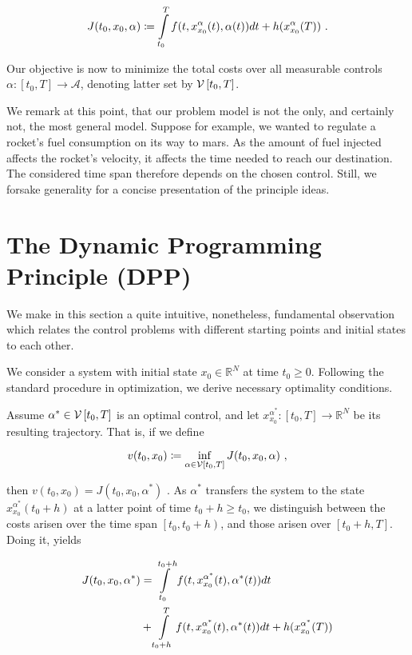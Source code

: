 	\begin{equation*}
	J(t_0, x_0, \alpha) \coloneqq \pathint{\alpha}{t_0}{T} + h(x^{\alpha}_{x_0}(T)) \ .
	\end{equation*}
	
	Our objective is now to minimize the total costs over all measurable controls $ \alpha : \left[t_0, T \right] \to \mathcal{A} $, denoting latter set by $ \controlspace[t_0] $.
	
	We remark at this point, that our problem model is not the only, and certainly not, the most general model. Suppose for example, we wanted to regulate a rocket's fuel consumption on its way to mars. As the amount of fuel injected affects the rocket's velocity, it affects the time needed to reach our destination. The considered time span therefore depends on the chosen control. Still, we forsake generality for a concise presentation of the principle ideas.
	
	\section{The Dynamic Programming Principle (DPP)}
	
	We make in this section a quite intuitive, nonetheless, fundamental observation which relates the control problems with different starting points and initial states to each other.
	
	We consider a system with initial state $ x_0 \in \mathbb{R}^N $ at time $ t_0 \geq 0 $. Following the standard procedure in optimization, we derive necessary optimality conditions. 
	
	Assume $ \alpha^{*} \in \controlspace[t_0] $ is an optimal control, and let $ x^{\alpha^{*}}_{x_0} : \left[t_0, T \right] \to \mathbb{R}^N $ be its resulting trajectory. That is, if we define
	
	\begin{equation*}
		v(t_0, x_0) \coloneqq \inf\limits_{\alpha \in \controlspace[t_0]} J(t_0, x_0, \alpha) \ ,
	\end{equation*}
	
	then $ v(t_0, x_0) = J(t_0, x_0, \alpha^{*}) $ . As  $ \alpha^{*} $ transfers the system to the state $ x^{\alpha^{*}}_{x_0}(t_0 + h) $ at a latter point of time $ t_0 + h \geq t_0 $, we distinguish between the costs arisen over the time span $ \left[t_0, t_0 + h\right) $, and those arisen over $ \left[ t_0 + h, T \right] $. Doing it, yields 
	
	\begin{equation*}
		\begin{split}
		J(t_0, x_0, \alpha^{*})& = \pathint{\alpha^{*}}{t_0}{t_0 + h} \\
		 &+ \pathint{\alpha^{*}}{t_0 + h}{T} + h(x^{\alpha^{*}}_{x_0}(T)) 
		\end{split}
	\end{equation*}
	
